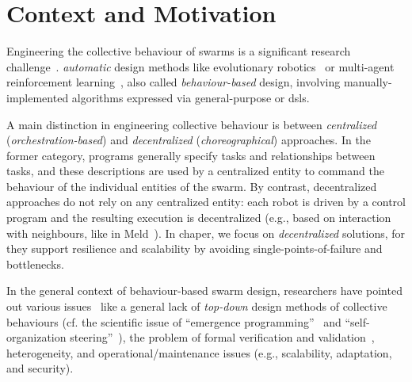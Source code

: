 \section{Context and Motivation}
\label{coordination2023-macro:sec:context}

Engineering the collective behaviour of swarms is 
 a significant research challenge~\cite{DBLP:journals/swarm/BrambillaFBD13}.
%
 \emph{automatic} design methods like evolutionary robotics~\cite{DBLP:series/sci/2008-108} or multi-agent reinforcement learning~\cite{DBLP:journals/tsmc/BusoniuBS08},
 also called \emph{behaviour-based} design, involving manually-implemented algorithms expressed via general-purpose or \acp{dsl}.
%
%

A main distinction in engineering collective behaviour is between \emph{centralized} (\emph{orchestration-based}) and \emph{decentralized} (\emph{choreographical}) approaches.
%
In the former category,
 programs generally specify tasks and relationships between tasks, %
 and these descriptions are used by a centralized entity
 to command the behaviour of the individual entities of the swarm.
%
By contrast,
 decentralized approaches
 do not rely on any centralized entity:
 each robot is driven by a control program 
 and the resulting execution is decentralized
 (e.g., based on interaction with neighbours, like in Meld~\cite{Meld2007}).
%
In chaper, we focus on \emph{decentralized} solutions, for they support resilience and scalability by avoiding single-points-of-failure and bottlenecks.


In the general context of behaviour-based swarm design,
 researchers have pointed out various issues~\cite{DBLP:journals/swarm/BrambillaFBD13,DBLP:journals/scirobotics/TheraulazT20}
 like a general lack
 of \emph{top-down} design methods of collective behaviours
 (cf. the scientific issue of ``emergence programming''~\cite{varenne2015programming-emergence} and  ``self-organization steering''~\cite{DBLP:journals/alife/GershensonTWS20}),
 the problem of formal verification and validation~\cite{DBLP:journals/csur/LuckcuckFDDF19},
 heterogeneity, 
 and operational/maintenance issues
 (e.g., scalability, adaptation, and security). 

